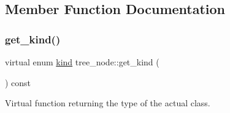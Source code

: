 \subsection{Member Function Documentation}
\mbox{\label{classtree__node_aa020fd7c4ac6d0d748c8b8512809b136}} 
\subsubsection{\texorpdfstring{get\+\_\+kind()}{get\_kind()}\hspace{0.1cm}{\footnotesize\ttfamily [1/2]}}
{\footnotesize\ttfamily virtual enum \hyperlink{tree__common_8hpp_a9efbd7c7191fb190b76c2fd05d6e7b45}{kind} tree\+\_\+node\+::get\+\_\+kind (\begin{DoxyParamCaption}{ }\end{DoxyParamCaption}) const\hspace{0.3cm}{\ttfamily [pure virtual]}}



Virtual function returning the type of the actual class. 



